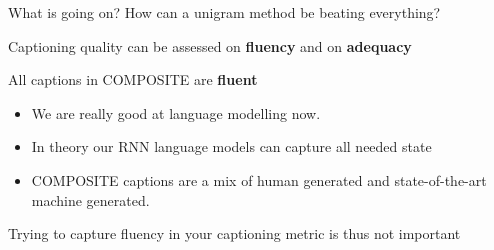 \documentclass[dvipsnames]{beamer}
\renewcommand{\emph}{\alert}
\newcommand{\countertitle}[1]{{\centering \Large \color{bluewrite} #1}}
\begin{document}
\begin{frame}{What is going on? How can a unigram method be beating everything?}
	
	\countertitle{Captioning quality can be assessed on \textbf{fluency} and on \textbf{adequacy}}
\end{frame}

\begin{frame}{All captions in COMPOSITE are \textbf{fluent}}
	\begin{itemize}
		\item We are really good at language modelling now.
		\item In theory our RNN language models can capture all needed state
		\item COMPOSITE captions are a mix of \emph{human generated} and \emph{state-of-the-art machine generated}.
	\end{itemize}
	
	\countertitle{Trying to capture fluency in your captioning metric is thus not important}
\end{frame}
\end{document}
